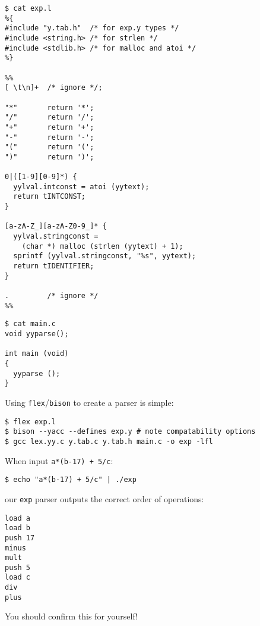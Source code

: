 \begin{slide*}
\begin{scriptsize}
\begin{verbatim}
$ cat exp.l
%{
#include "y.tab.h"  /* for exp.y types */
#include <string.h> /* for strlen */
#include <stdlib.h> /* for malloc and atoi */
%}
 
%%
[ \t\n]+  /* ignore */;
 
"*"       return '*';
"/"       return '/';
"+"       return '+';
"-"       return '-';
"("       return '(';
")"       return ')';
 
0|([1-9][0-9]*) { 
  yylval.intconst = atoi (yytext);
  return tINTCONST; 
}

[a-zA-Z_][a-zA-Z0-9_]* { 
  yylval.stringconst = 
    (char *) malloc (strlen (yytext) + 1);
  sprintf (yylval.stringconst, "%s", yytext); 
  return tIDENTIFIER;
}

.         /* ignore */
%%
\end{verbatim}
\end{scriptsize}
\vfil
\end{slide*}

\begin{slide*}
\begin{scriptsize}
\begin{verbatim}
$ cat main.c
void yyparse();

int main (void)
{ 
  yyparse ();
}
\end{verbatim}
\end{scriptsize}

\vspace{1em}

Using {\tt flex}/{\tt bison} to create a parser is simple:
\begin{scriptsize}
\begin{verbatim}
$ flex exp.l
$ bison --yacc --defines exp.y # note compatability options
$ gcc lex.yy.c y.tab.c y.tab.h main.c -o exp -lfl
\end{verbatim}
\end{scriptsize}

\vspace{1em}

When input {\tt a*(b-17) + 5/c}:

\begin{scriptsize}
\begin{verbatim}
$ echo "a*(b-17) + 5/c" | ./exp
\end{verbatim}
\end{scriptsize}

our {\tt exp} parser outputs the correct order of operations:

\begin{scriptsize}
\begin{verbatim}
load a
load b
push 17
minus
mult
push 5
load c
div
plus
\end{verbatim}
\end{scriptsize}

You should confirm this for yourself!
\vfil
\end{slide*}

